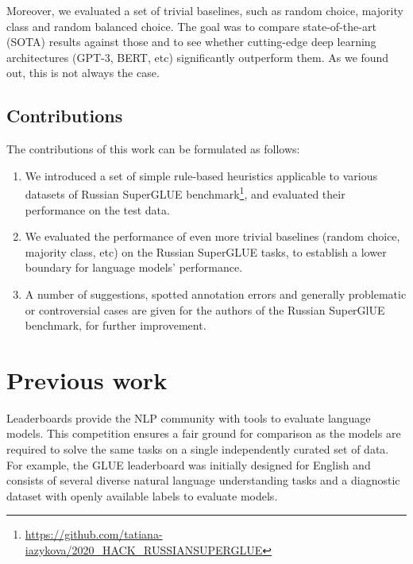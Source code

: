 \documentclass[11pt]{article}
\begin{document}
Moreover, we evaluated a set of trivial baselines, such as random choice, majority class and random balanced choice. The goal was to compare state-of-the-art (SOTA) results against those and to see whether cutting-edge deep learning architectures (GPT-3, BERT, etc) significantly outperform them. As we found out, this is not always the case. 

\subsection{Contributions}

The contributions of this work can be formulated as follows:
\begin{enumerate}
    \item We introduced a set of simple rule-based heuristics applicable to various datasets of Russian SuperGLUE benchmark\footnote{\url{https://github.com/tatiana-iazykova/2020_HACK_RUSSIANSUPERGLUE}}, and evaluated their performance on the test data.
    \item We evaluated the performance of even more trivial baselines (random choice, majority class, etc) on the Russian SuperGLUE tasks, to establish a lower boundary for language models' performance.
    \item A number of suggestions, spotted annotation errors and generally problematic or controversial cases are given for the authors of the Russian SuperGlUE benchmark, for further improvement.
\end{enumerate}


\section{Previous work}
\label{sec:previous_work}

Leaderboards provide the NLP community with tools to evaluate language models. This competition ensures a fair ground for comparison as the models are required to solve the same tasks on a single independently curated set of data. For example, the GLUE leaderboard \cite{wang-etal-2018-glue} was initially designed for English and consists of several diverse natural language understanding tasks and a diagnostic dataset with openly available labels to evaluate models. 
\end{document}
